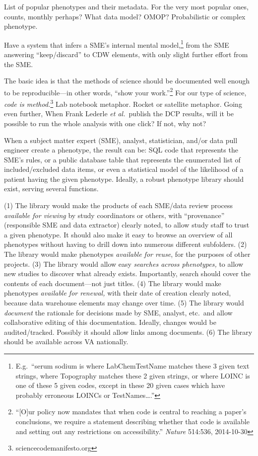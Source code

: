 \documentclass{tufte-handout}
\begin{document}

List of popular phenotypes and their metadata. For the very most
popular ones, counts, monthly perhaps? What data model? OMOP?
Probabilistic or complex phenotype.

Have a system that infers a SME's internal mental
model,\footnote{E.g.\ ``serum sodium is where LabChemTestName matches
  these 3 given text strings, where Topography matches these 2 given
  strings, or where LOINC is one of these 5 given codes, except in
  these 20 given cases which have probably erroneous LOINCs or
  TestNames\ldots{}.''} from the SME answering ``keep/discard'' to CDW
elements, with only slight further effort from the SME.

The basic idea is that the methods of science should be documented
well enough to be reproducible---in other words, ``show your
work.''\footnote{``[O]ur policy now mandates that when code is central
  to reaching a paper's conclusions, we require a statement describing
  whether that code is available and setting out any restrictions on
  accessibility.'' \emph{Nature} 514:536, 2014-10-30} For our type of
science, \emph{code is method.}\footnote{sciencecodemanifesto.org} Lab
notebook metaphor. Rocket or satellite metaphor. Going even further,
When Frank Lederle \emph{et al.}\ publish the DCP results, will it be
possible to run the whole analysis with one click? If not, why not?


When a subject matter expert (SME), analyst, statistician, and/or data
pull engineer create a phenotype, the result can be: SQL code that
represents the SME's rules, or a public database table that represents
the enumerated list of included/excluded data items, or even a
statistical model of the likelihood of a patient having the given
phenotype. Ideally, a robust phenotype library should exist, serving
several functions.

(1) The library would make the products of each SME/data review
process \emph{available for viewing} by study coordinators or others,
with ``provenance'' (responsible SME and data extractor) clearly
noted, to allow study staff to trust a given phenotype. It should also
make it easy to browse an overview of all phenotypes without having to
drill down into numerous different subfolders. (2) The library would
make phenotypes \emph{available for reuse}, for the purposes of other
projects. (3) The library would allow easy \emph{searches across
  phenotypes,} to allow new studies to discover what already exists.
Importantly, search should cover the contents of each document---not
just titles. (4) The library would make phenotypes \emph{available for
  renewal,} with their date of creation clearly noted, because data
warehouse elements may change over time. (5) The library would
\emph{document} the rationale for decisions made by SME, analyst,
etc.\ and allow collaborative editing of this documentation. Ideally,
changes would be audited/tracked. Possibly it should allow links among
documents. (6) The library should be available across VA nationally.
\end{document}
